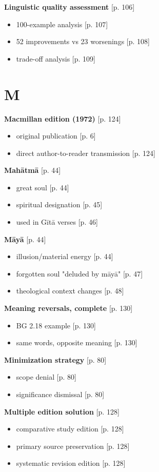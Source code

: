\documentclass[11pt,twoside]{book}
\begin{document}
\textbf{\textbf{Linguistic quality assessment}} {[}p. 106]
\begin{itemize}
\item 100-example analysis [p. 107]
\item 52 improvements vs 23 worsenings [p. 108]
\item trade-off analysis [p. 109]
\end{itemize}
\section*{M}
\label{sec:org8828637}

\textbf{\textbf{Macmillan edition (1972)}} {[}p. 124]
\begin{itemize}
\item original publication [p. 6]
\item direct author-to-reader transmission [p. 124]
\end{itemize}

\textbf{\textbf{Mahātmā}} {[}p. 44]
\begin{itemize}
\item great soul [p. 44]
\item spiritual designation [p. 45]
\item used in Gītā verses [p. 46]
\end{itemize}

\textbf{\textbf{Māyā}} {[}p. 44]
\begin{itemize}
\item illusion/material energy [p. 44]
\item forgotten soul "deluded by māyā" [p. 47]
\item theological context changes [p. 48]
\end{itemize}

\textbf{\textbf{Meaning reversals, complete}} {[}p. 130]
\begin{itemize}
\item BG 2.18 example [p. 130]
\item same words, opposite meaning [p. 130]
\end{itemize}

\textbf{\textbf{Minimization strategy}} {[}p. 80]
\begin{itemize}
\item scope denial [p. 80]
\item significance dismissal [p. 80]
\end{itemize}

\textbf{\textbf{Multiple edition solution}} {[}p. 128]
\begin{itemize}
\item comparative study edition [p. 128]
\item primary source preservation [p. 128]
\item systematic revision edition [p. 128]
\end{itemize}
\end{document}
